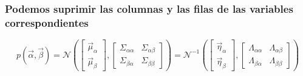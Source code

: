 \begin{frame}
    \frametitle{Podemos suprimir las columnas y las filas de las variables correspondientes}

    
    \scriptsize

    \begin{equation*}
        p(\vec{\alpha}, \vec{\beta}) = \mathcal{N} \left(
        \begin{bmatrix}
            \vec{\mu}_{\alpha} \\
            \vec{\mu}_{\beta}
            \end{bmatrix},
            \begin{bmatrix}
            \Sigma_{\alpha\alpha} & \Sigma_{\alpha\beta} \\
            \Sigma_{\beta\alpha} & \Sigma_{\beta\beta}
        \end{bmatrix}
        \right)
        = \mathcal{N}^{-1} \left(
        \begin{bmatrix}
            \vec{\eta}_{\alpha} \\
            \vec{\eta}_{\beta}
            \end{bmatrix},
            \begin{bmatrix}
            \Lambda_{\alpha\alpha} & \Lambda_{\alpha\beta} \\
            \Lambda_{\beta\alpha} & \Lambda_{\beta\beta}
        \end{bmatrix}
        \right)
    \end{equation*}
    

\end{frame}
